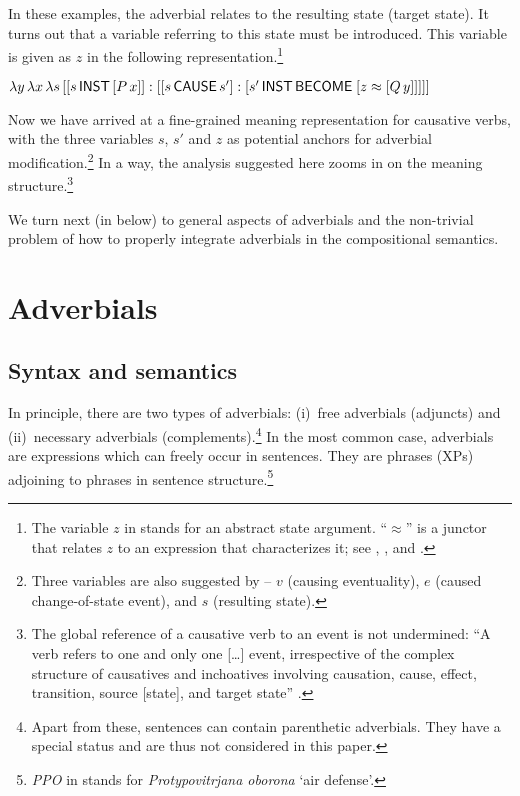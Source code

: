 \documentclass[output=paper]{langscibook}
\begin{document}
\noindent In these examples, the adverbial relates to the resulting state (target state). It turns out that a variable referring to this state must be introduced. This variable is given as $z$ in the following representation.\footnote{The variable $z$ in  stands for an abstract state argument. “$\approx$” is a junctor that relates $z$ to an expression that characterizes it; see \citet{Maienborn2003,Maienborn2005,Maienborn2007}, \citet{Geist2006}, and \citet{Pitsch2014}.}

\ea%
    \label{ex:junghanns:30}
$\lambda y \, \lambda x \, \lambda s \, [[s\, \cnstx{inst} \, [P\, x]] : [[s\, \cnstx{cause}\, s'] : [s'\, \cnstx{inst}\, \cnstx{become} \; [z \approx [Q\, y]]]]]$
\z

\noindent Now we have arrived at a fine-grained meaning representation for causative verbs, with the three variables $s$, $s'$ and $z$ as potential anchors for adverbial modification.\footnote{Three variables are also suggested by \citet[85]{Koontz-Garboden2009} -- $v$ (causing eventuality), $e$ (caused change-of-state event), and $s$ (resulting state).} In a way, the analysis suggested here zooms in on the meaning structure.\footnote{The global reference of a causative verb to an event is not undermined: “A verb refers to one and only one […] event, irrespective of the complex structure of causatives and inchoatives involving causation, cause, effect, transition, source [state], and target state” \citep[11]{Bierwisch2005}.}

We turn next (in  below) to general aspects of adverbials and the non-trivial problem of how to properly integrate adverbials in the compositional semantics.

\section{Adverbials} \label{sec:junghanns:3}
\subsection{Syntax and semantics}
\label{sec:junghanns:3.1}

In principle, there are two types of adverbials: (i)~free adverbials (adjuncts) and (ii)~necessary adverbials (complements).\footnote{Apart from these, sentences can contain parenthetic adverbials. They have a special status and are thus not considered in this paper.} In the most common case, adverbials are expressions which can freely occur in sentences. They are phrases (XPs) adjoining to phrases in sentence structure.\footnote{\textit{PPO} in  stands for \textit{Protypovitrjana oborona} ‘air defense’.}
\end{document}
